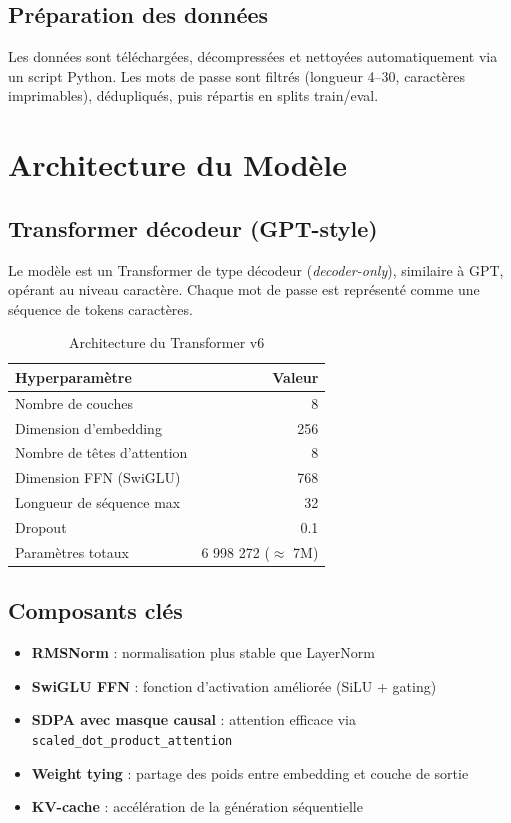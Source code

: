 \documentclass[12pt,a4paper]{article}
\begin{document}
\subsection{Préparation des données}

Les données sont téléchargées, décompressées et nettoyées automatiquement via un script Python. Les mots de passe sont filtrés (longueur 4--30, caractères imprimables), dédupliqués, puis répartis en splits train/eval.

\section{Architecture du Modèle}

\subsection{Transformer décodeur (GPT-style)}

Le modèle est un Transformer de type décodeur (\textit{decoder-only}), similaire à GPT, opérant au niveau caractère. Chaque mot de passe est représenté comme une séquence de tokens caractères.

\begin{table}[H]
\centering
\begin{tabular}{lr}
\toprule
\textbf{Hyperparamètre} & \textbf{Valeur} \\
\midrule
Nombre de couches & 8 \\
Dimension d'embedding & 256 \\
Nombre de têtes d'attention & 8 \\
Dimension FFN (SwiGLU) & 768 \\
Longueur de séquence max & 32 \\
Dropout & 0.1 \\
Paramètres totaux & 6 998 272 ($\approx$ 7M) \\
\bottomrule
\end{tabular}
\caption{Architecture du Transformer v6}
\end{table}

\subsection{Composants clés}

\begin{itemize}
    \item \textbf{RMSNorm} : normalisation plus stable que LayerNorm
    \item \textbf{SwiGLU FFN} : fonction d'activation améliorée (SiLU + gating)
    \item \textbf{SDPA avec masque causal} : attention efficace via \texttt{scaled\_dot\_product\_attention}
    \item \textbf{Weight tying} : partage des poids entre embedding et couche de sortie
    \item \textbf{KV-cache} : accélération de la génération séquentielle
\end{itemize}
\end{document}
